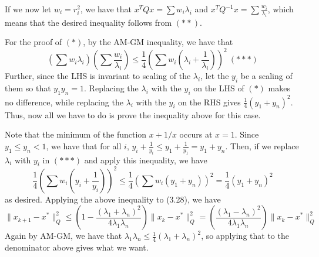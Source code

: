 \documentclass{article}
\begin{document}
If we now let $w_i=r_i^2$, we have that $x^TQx=\sum w_i\lambda_i$ and $x^TQ^{-1}x=\sum \frac{w_i}{\lambda_i}$, which means that the desired inequality follows from $(**)$.

For the proof of $(*)$, by the AM-GM inequality, we have that 
\[\left(\sum w_i\lambda_i\right)\left(\sum\frac{w_i}{\lambda_i}\right)\leq\frac{1}{4}\left(\sum w_i\left(\lambda_i+\frac{1}{\lambda_i}\right)\right)^2\ (***)\]
Further, since the LHS is invariant to scaling of the $\lambda_i$, let the $y_i$ be a scaling of them so that $y_1y_n=1$. Replacing the $\lambda_i$ with the $y_i$ on the LHS of $(*)$ makes no difference, while replacing the $\lambda_i$ with the $y_i$ on the RHS gives $\frac{1}{4}(y_1+y_n)^2$. Thus, now all we have to do is prove the inequality above for this case.

Note that the minimum of the function $x+1/x$ occurs at $x=1$. Since $y_1\leq y_n<1$, we have that for all $i$, $y_i+\frac{1}{y_i}\leq y_1+\frac{1}{y_1}=y_1+y_n$. Then, if we replace $\lambda_i$ with $y_i$ in $(***)$ and apply this inequality, we have
\[\frac{1}{4}\left(\sum w_i\left(y_i+\frac{1}{y_i}\right)\right)^2\leq\frac{1}{4}\left(\sum w_i(y_1+y_n)\right)^2=\frac{1}{4}(y_1+y_n)^2\]
as desired.
Applying the above inequality to (3.28), we have
\[\|x_{k+1}-x^*\|_Q^2\leq\left(1-\frac{(\lambda_1+\lambda_n)^2}{4\lambda_1\lambda_n}\right)\|x_k-x^*\|_Q^2=\left(\frac{(\lambda_1-\lambda_n)^2}{4\lambda_1\lambda_n}\right)\|x_k-x^*\|_Q^2\]
Again by AM-GM, we have that $\lambda_1\lambda_n\leq\frac{1}{4}(\lambda_1+\lambda_n)^2$, so applying that to the denominator above gives what we want.
\end{document}
